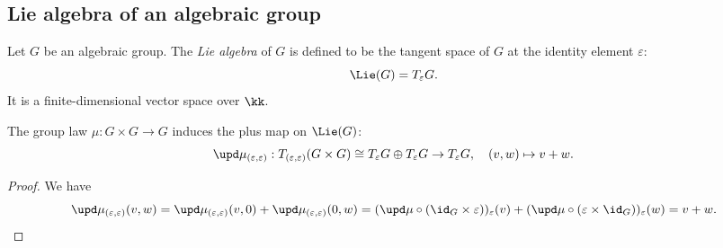 


\subsection{Lie algebra of an algebraic group}

    Let \(G\) be an algebraic group.
    The \emph{Lie algebra} of \(G\) is defined to be the tangent space of \(G\) at the identity element \(\varepsilon\):
    \[
        \Lie(G) = T_\varepsilon G.
    \]
    It is a finite-dimensional vector space over \(\kk\).

    \begin{proposition}\label{prop:multiplication_of_group_induces_plus_on_Lie_algebra}
        The group law \(\mu: G \times G \to G\) induces the plus map on \(\Lie(G)\):
        \[
            \upd\mu_{(\varepsilon,\varepsilon)}: T_{(\varepsilon,\varepsilon)}(G \times G) \cong T_\varepsilon G \oplus T_\varepsilon G \to T_\varepsilon G, \quad (v,w) \mapsto v + w.
        \]
    \end{proposition}
    \begin{proof}
        We have 
        \[ \upd \mu_{(\varepsilon,\varepsilon)}(v,w) = \upd \mu_{(\varepsilon,\varepsilon)}(v,0) + \upd \mu_{(\varepsilon,\varepsilon)}(0,w) = (\upd \mu \circ (\id_G \times \varepsilon))_\varepsilon(v) + (\upd \mu \circ (\varepsilon \times \id_G))_\varepsilon(w) = v + w. \]
    \end{proof}
